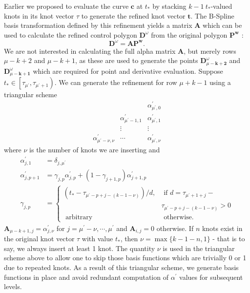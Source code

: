 \documentclass[acmtog]{acmart}
\begin{document}
Earlier we proposed to evaluate the curve $\mathbf{c}$ at $t_*$ by stacking $k-1 \ t_*$-valued knots in its knot vector $\tau$ to generate the refined knot vector $\mathbf{t}$. The B-Spline basis transformation defined by this refinement yields a matrix $\mathbf{A}$ which can be used to calculate the refined control polygon $\mathbf{D}^\omega$ from the original polygon $\mathbf{P}^{\mathbf{w}}$ :
$$
\mathbf{D}^\omega=\mathbf{A} \mathbf{P}^{\mathbf{w}}.
$$
We are not interested in calculating the full alpha matrix $\mathbf{A}$, but merely rows $\mu-k+2$ and $\mu-k+1$, as these are used to generate the points $\mathbf{D}_{\mu-\mathbf{k}+\mathbf{2}}^\omega$ and $\mathbf{D}_{\mu-\mathbf{k + 1}}^\omega$ which are required for point and derivative evaluation.
Suppose $t_* \in\left[\tau_{\mu^{\prime}}, \tau_{\mu^{\prime}+1}\right)$. We can generate the refinement for row $\mu+k-1$ using a triangular scheme
$$
\begin{array}{rcc} 
& & \alpha_{\mu^{\prime}, 0}^{\prime} \\
& \alpha_{\mu^{\prime}-1,1}^{\prime} & \alpha_{\mu^{\prime}, 1}^{\prime} \\
& \vdots & \vdots \\
\alpha_{\mu^{\prime}-\nu, \nu}^{\prime} & \cdots & \alpha_{\mu^{\prime}, \nu}^{\prime}
\end{array}
$$
where $\nu$ is the number of knots we are inserting and
$$
\begin{aligned}
\alpha_{j, 1}^{\prime} & =\delta_{j, \mu^{\prime}} \\
\alpha_{j, p+1}^{\prime} & =\gamma_{j, p} \alpha_{j, p}^{\prime}+\left(1-\gamma_{j+1, p}\right) \alpha_{j+1, p}^{\prime} \\
\gamma_{j, p} & = \begin{cases}\left(t_*-\tau_{\mu^{\prime}-p+j-(k-1-\nu)}\right) / d, & \text { if } d=\tau_{\mu^{\prime}+1+j}-\\&\tau_{\mu^{\prime}-p+j-(k-1-\nu)}>0 \\
\text { arbitrary } & \text { otherwise. }\end{cases}
\end{aligned}
$$
$\mathbf{A}_{\mu-k+1, j}=\alpha_{j, \nu}^{\prime}$ for $j=\mu^{\prime}-\nu, \cdots, \mu^{\prime}$ and $\mathbf{A}_{i, j}=0$ otherwise. If $n$ knots exist in the original knot vector $\tau$ with value $t_*$, then $\nu=\max \{k-1-n, 1\}$ - that is to say, we always insert at least 1 knot. The quantity $\nu$ is used in the triangular scheme above to allow one to skip those basis functions which are trivially 0 or 1 due to repeated knots. As a result of this triangular scheme, we generate basis functions in place and avoid redundant computation of $\alpha^{\prime}$ values for subsequent levels.
\end{document}
